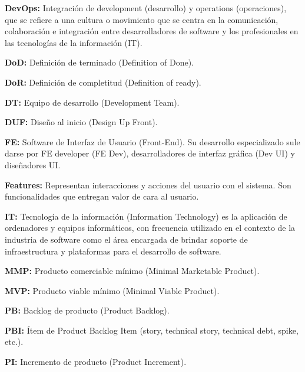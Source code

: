 \begin{description}
 \item {\textbf{DevOps:} Integración de development (desarrollo) y operations (operaciones), que se refiere a una cultura o movimiento que se centra en la comunicación, colaboración e integración entre desarrolladores de software y los profesionales en las tecnologías de la información (IT).}
 
  \item {\textbf{DoD:} Definición de terminado (Definition of Done).}
  
  \item {\textbf{DoR:} Definición de completitud (Definition of ready).}
  
  \item {\textbf{DT:} Equipo de desarrollo (Development Team).}
  
  \item {\textbf{DUF:} Diseño al inicio (Design Up Front).}

  \item {\textbf{FE:} Software de Interfaz de Usuario (Front-End). Su desarrollo especializado sule darse por FE developer (FE Dev), desarrolladores de interfaz gráfica (Dev UI) y diseñadores UI.}
  
  \item {\textbf{Features:} Representan interacciones y acciones del usuario con el sistema. Son funcionalidades que entregan valor de cara al usuario.}
  
  \item {\textbf{IT:} Tecnología de la información (Information Technology) es la aplicación de ordenadores y equipos informáticos, con frecuencia utilizado en el contexto de la industria de software como el área encargada de brindar soporte de infraestructura y plataformas para el desarrollo de software.}
  
  \item {\textbf{MMP:} Producto comerciable mínimo (Minimal Marketable Product).}
  
  \item {\textbf{MVP:} Producto viable mínimo (Minimal Viable Product).}
  
  \item {\textbf{PB:} Backlog de producto (Product Backlog).}
  
  \item {\textbf{PBI:} Ítem de Product Backlog Item (story, technical story, technical debt, spike, etc.).}
  
  \item {\textbf{PI:} Incremento de producto (Product Increment).}
  

\end{description}
